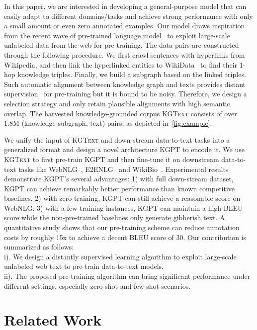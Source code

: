 \documentclass[11pt,a4paper]{article}
\newcommand{\dataset}{\textsc{KGText}\xspace}
\newcommand{\model}{KGPT\xspace}
\begin{document}
In this paper, we are interested in developing a general-purpose model that can easily adapt to different domains/tasks and achieve strong performance with only a small amount or even zero annotated examples. Our model draws inspiration from the recent wave of pre-trained language model~\cite{devlin2019bert,radford2019language,dai2019transformer} to exploit large-scale unlabeled data from the web for pre-training. The data pairs are constructed through the following procedure. We first crawl sentences with hyperlinks from Wikipedia, and then link the hyperlinked entities to WikiData~\cite{vrandevcic2014wikidata} to find their 1-hop knowledge triples. Finally, we build a subgraph based on the linked triples. Such automatic alignment between knowledge graph and texts provides distant supervision~\cite{mintz2009distant} for pre-training but it is bound to be noisy. Therefore, we design a selection strategy and only retain plausible alignments with high semantic overlap. The harvested knowledge-grounded corpus \dataset consists of over 1.8M (knowledge subgraph, text) pairs, as depicted in~\autoref{fig:example}. 

We unify the input of \dataset and down-stream data-to-text tasks into a generalized format and design a novel architecture \model to encode it. We use \dataset to first pre-train \model and then fine-tune it on downstream data-to-text tasks like WebNLG~\cite{shimorina2018handling}, E2ENLG~\cite{dusek2019e2e} and WikiBio~\cite{liu2018table}.
Experimental results demonstrate \model's several advantages: 1) with full down-stream dataset, \model can achieve remarkably better performance than known competitive baselines, 2) with zero training, \model can still achieve a reasonable score on WebNLG. 3) with a few training instances, \model can maintain a high BLEU score while the non-pre-trained baselines only generate gibberish text. A quantitative study shows that our pre-training scheme can reduce annotation costs by roughly 15x to achieve a decent BLEU score of 30.
Our contribution is summarized as follows:\\
    \indent i). We design a distantly supervised learning algorithm to exploit large-scale unlabeled web text to pre-train data-to-text models. \\
    \indent ii).  The proposed pre-training algorithm can bring significant performance under different settings, especially zero-shot and few-shot scenarios.
\section{Related Work}
\end{document}
